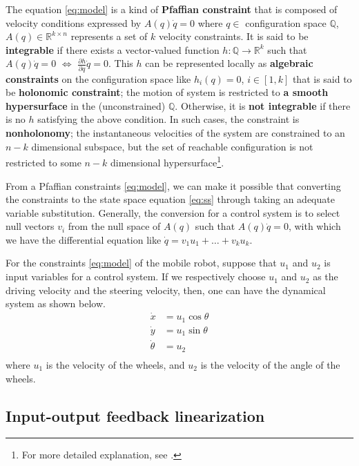 \documentclass[11pt, a4paper, oneside, openany, reqno]{book}
\theoremstyle{definition}
\theoremstyle{remark}
\numberwithin{equation}{chapter} %
\newcommand{\R}{\ensuremath{{\mathbb R}}}
\begin{document}
The equation \eqref{eq:model} is a kind of \textbf{Pfaffian constraint} 
that is composed of velocity conditions expressed by $ A(q)\dot{q}=0 $ 
where $ q \in $ configuration space $ \mathbb{Q} $, $ A(q)\in \R ^{k \times n} $ 
represents a set of $ k $ velocity constraints. 
It is said to be \textbf{integrable} if there exists a vector-valued
function $ h:\mathbb{Q} \to \R^{k} $ such that 
$ A(q)\dot{q}=0 $ $ \Longleftrightarrow $ $ \frac{\partial h}{\partial q}\dot{q}=0 $. 
This $ h $ can be represented locally as \textbf{algebraic constraints} 
on the configuration space like $ h_{i}(q)=0 $, $ i \in \left[ 1,k \right]  $ 
that is said to be \textbf{holonomic constraint}; 
the motion of system is restricted to \textbf{a smooth hypersurface} 
in the (unconstrained) $\mathbb{Q}$.
Otherwise, it is \textbf{not integrable} if there is no $ h $ satisfying the above condition. 
In such cases, the constraint is \textbf{nonholonomy}; 
the instantaneous velocities of the system are constrained to an $ n-k $ dimensional subspace, 
but the set of reachable configuration is not restricted to some $ n-k $ dimensional hypersurface\footnote
{For more detailed explanation, see \cite{bi:murray, sastry}.}.
		
From a Pfaffian constraints \eqref{eq:model}, we can make it possible that 
converting the constraints to the state space equation \eqref{eq:ss}
through taking an adequate variable substitution.
Generally, the conversion for a control system is to select null vectors $ v_{i} $ 
from the null space of $ A(q) $ such that $ A(q)\dot{q}=0 $,
with which we have the differential equation 
like $ \dot{q}=v_{1} u_{1} + \ldots + v_{k} u_{k} $. 

For the constraints \eqref{eq:model} of the mobile robot,
suppose that $ u_{1} $ and $ u_{2} $ is input variables for a control system. 
If we respectively choose $ u_1 $ and $ u_2 $ as the driving velocity and the steering velocity,
then, one can have the dynamical system as shown below.
\begin{equation}\begin{split}\label{eq:ss}
	\dot{x}&=u_1 \cos \theta\\
	\dot{y}&=u_1 \sin \theta\\
	\dot{\theta}&=u_2\\	
\end{split}\end{equation} 
where $ u_{1} $ is the velocity of the wheels, 
and $ u_{2} $ is the velocity of the angle of the wheels.

\subsection{Input-output feedback linearization}
\end{document}

